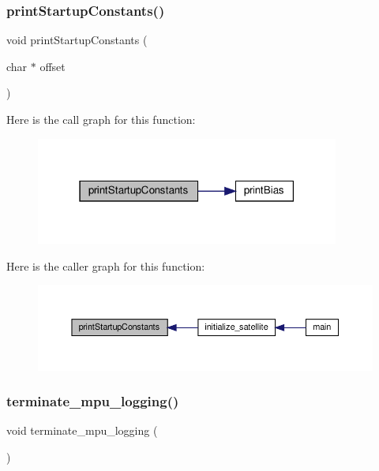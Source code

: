 \subsubsection{\texorpdfstring{print\+Startup\+Constants()}{printStartupConstants()}}
{\footnotesize\ttfamily void print\+Startup\+Constants (\begin{DoxyParamCaption}\item[{char $\ast$}]{offset }\end{DoxyParamCaption})}

Here is the call graph for this function\+:
\nopagebreak
\begin{figure}[H]
\begin{center}
\leavevmode
\includegraphics[width=283pt]{i2c-interface_8h_a7584f35073e31c1833be60c696482e9a_cgraph}
\end{center}
\end{figure}
Here is the caller graph for this function\+:
\nopagebreak
\begin{figure}[H]
\begin{center}
\leavevmode
\includegraphics[width=350pt]{i2c-interface_8h_a7584f35073e31c1833be60c696482e9a_icgraph}
\end{center}
\end{figure}
\mbox{\label{i2c-interface_8h_a3644aefb56a2169f316b0f2510ffc56c}} 
\subsubsection{\texorpdfstring{terminate\+\_\+mpu\+\_\+logging()}{terminate\_mpu\_logging()}}
{\footnotesize\ttfamily void terminate\+\_\+mpu\+\_\+logging (\begin{DoxyParamCaption}{ }\end{DoxyParamCaption})}

